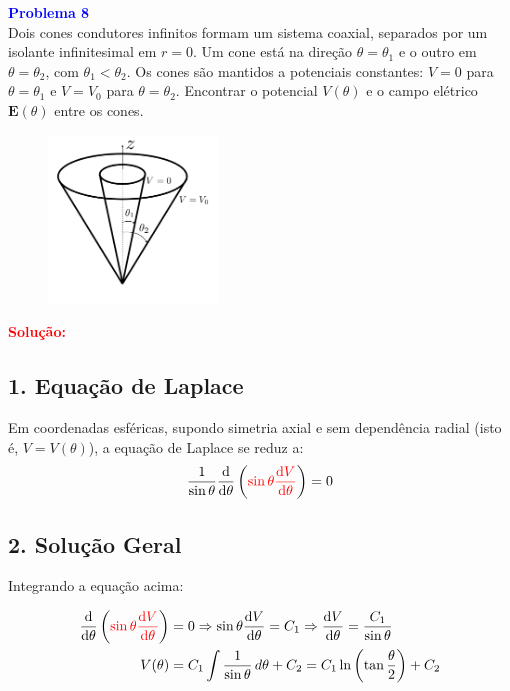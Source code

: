 \documentclass[a4paper,12pt]{article}
\begin{document}
\begin{flushleft}
\textbf{\textcolor{blue}{\Large Problema 8}}\\
Dois cones condutores infinitos formam um sistema coaxial, separados por um isolante 
infinitesimal em \( r = 0 \). Um cone está na direção \( \theta = \theta_1 \) e o outro 
em \( \theta = \theta_2 \), com \( \theta_1 < \theta_2 \). Os cones são mantidos a 
potenciais constantes: \( V = 0 \) para \( \theta = \theta_1 \) e \( V = V_0 \) para \( \theta = \theta_2 \). 
Encontrar o potencial \( V(\theta) \) e o campo elétrico \( \mathbf{E}(\theta) \) entre os cones.

\begin{figure}[h]
\centering
\includegraphics[width=0.4\textwidth]{figures/q8_fig1.png} %
\end{figure}

\textcolor{red}{\textbf{Solução:}}\\


\subsection*{1. Equação de Laplace}

Em \colorbox{yellow!25}{coordenadas esféricas, supondo simetria axial e sem dependência radial} (isto é, \( V = V(\theta) \)), a equação de Laplace se reduz a:
\begin{equation}
\frac{1}{\sin \theta} \dv{\theta} \left(\textcolor{red}{ \sin \theta \dv{V}{\theta}} \right) = 0
\end{equation}

\subsection*{2. Solução Geral}

Integrando a equação acima:

\begin{align*}
\dv{\theta} \left( \textcolor{red}{ \sin \theta \dv{V}{\theta}} \right) &= 0 
\Rightarrow \sin \theta \dv{V}{\theta} = C_1 
\Rightarrow \dv{V}{\theta} = \frac{C_1}{\sin \theta} \\
V(\theta) &= C_1 \int \frac{1}{\sin \theta} \, d\theta + C_2 = C_1 \ln \left( \tan \frac{\theta}{2} \right) + C_2
\end{align*}


\end{flushleft}
\end{document}
